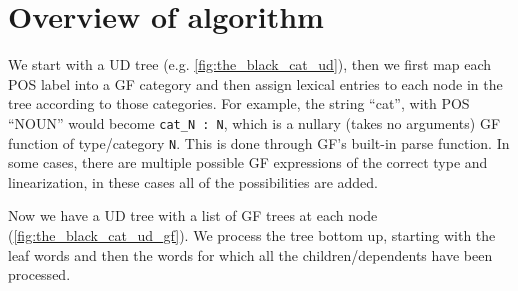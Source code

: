 %
%
%
%

\section{Overview of algorithm}\label{sec:overview-of-algorithm}

We start with a \ac{UD} tree (e.g. \autoref{fig:the_black_cat_ud}), then we first map each \ac{POS} label into a \ac{GF} category and then assign lexical entries to each node in the tree according to those categories. For example, the string ``cat'', with \ac{POS} ``NOUN'' would become \lstinline|cat_N : N|, which is a nullary (takes no arguments) \ac{GF} function of type/category \lstinline|N|. This is done through \ac{GF}'s built-in parse function. In some cases, there are multiple possible \ac{GF} expressions of the correct type and linearization, in these cases all of the possibilities are added.

Now we have a \ac{UD} tree with a list of \ac{GF} trees at each node (\autoref{fig:the_black_cat_ud_gf}). We process the tree bottom up, starting with the leaf words and then the words for which all the children/dependents have been processed.

